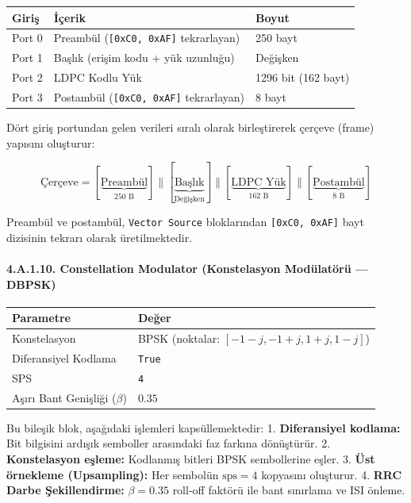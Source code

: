 \documentclass[
]{IEEEtran}
\newcounter{none} %
\begin{document}
{\def\LTcaptype{none} %
\begin{longtable}[]{@{}lll@{}}
\toprule\noalign{}
Giriş & İçerik & Boyut \\
\midrule\noalign{}
\endhead
\bottomrule\noalign{}
\endlastfoot
Port 0 & Preambül (\texttt{{[}0xC0,\ 0xAF{]}} tekrarlayan) & 250 bayt \\
Port 1 & Başlık (erişim kodu + yük uzunluğu) & Değişken \\
Port 2 & LDPC Kodlu Yük & 1296 bit (162 bayt) \\
Port 3 & Postambül (\texttt{{[}0xC0,\ 0xAF{]}} tekrarlayan) & 8 bayt \\
\end{longtable}
}

Dört giriş portundan gelen verileri sıralı olarak birleştirerek çerçeve
(frame) yapısını oluşturur:

\[\text{Çerçeve} = [\underbrace{\text{Preambül}}_{250 \text{ B}}] \| [\underbrace{\text{Başlık}}_{\text{Değişken}}] \| [\underbrace{\text{LDPC Yük}}_{162 \text{ B}}] \| [\underbrace{\text{Postambül}}_{8 \text{ B}}]\]

Preambül ve postambül, \texttt{Vector\ Source} bloklarından
\texttt{{[}0xC0,\ 0xAF{]}} bayt dizisinin tekrarı olarak üretilmektedir.

\paragraph{4.A.1.10. Constellation Modulator (Konstelasyon Modülatörü
---
DBPSK)}\label{a.1.10.-constellation-modulator-konstelasyon-moduxfclatuxf6ruxfc-dbpsk}

{\def\LTcaptype{none} %
\begin{longtable}[]{@{}ll@{}}
\toprule\noalign{}
Parametre & Değer \\
\midrule\noalign{}
\endhead
\bottomrule\noalign{}
\endlastfoot
Konstelasyon & BPSK (noktalar: \([-1-j, -1+j, 1+j, 1-j]\)) \\
Diferansiyel Kodlama & \texttt{True} \\
SPS & \texttt{4} \\
Aşırı Bant Genişliği (\(\beta\)) & \(0.35\) \\
\end{longtable}
}

Bu bileşik blok, aşağıdaki işlemleri kapsüllemektedir: 1.
\textbf{Diferansiyel kodlama:} Bit bilgisini ardışık semboller
arasındaki faz farkına dönüştürür. 2. \textbf{Konstelasyon eşleme:}
Kodlanmış bitleri BPSK sembollerine eşler. 3. \textbf{Üst örnekleme
(Upsampling):} Her sembolün \(\text{sps} = 4\) kopyasını oluşturur. 4.
\textbf{RRC Darbe Şekillendirme:} \(\beta = 0.35\) roll-off faktörü ile
bant sınırlama ve ISI önleme.
\end{document}
